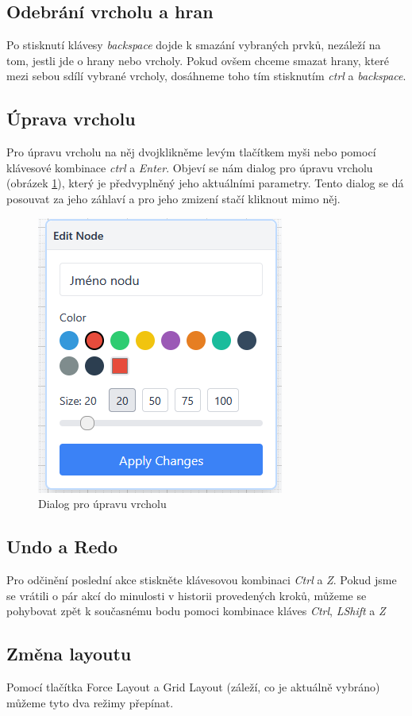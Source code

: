 \subsection{Odebrání vrcholu a hran}
Po stisknutí klávesy \textit{backspace} dojde k smazání vybraných prvků, nezáleží na tom, jestli jde o hrany nebo vrcholy. Pokud ovšem chceme smazat hrany, které mezi sebou sdílí vybrané vrcholy, dosáhneme toho tím stisknutím \textit{ctrl} a \textit{backspace}.
\subsection{Úprava vrcholu}
Pro úpravu vrcholu na něj dvojklikněme levým tlačítkem myši nebo pomocí klávesové kombinace \textit{ctrl} a \textit{Enter}. Objeví se nám dialog pro úpravu vrcholu (obrázek \ref{fig:edit}), který je předvyplněný jeho aktuálními parametry. Tento dialog se dá posouvat za jeho záhlaví a pro jeho zmizení stačí kliknout mimo něj.
\begin{figure}[h]
    \centering
    \includegraphics[width=0.5\linewidth]{Images/style.png}
    \caption{Dialog pro úpravu vrcholu}
    \label{fig:edit}
\end{figure}
\subsection{Undo a Redo}
Pro odčinění poslední akce stiskněte klávesovou kombinaci \textit{Ctrl} a \textit{Z}. Pokud jsme se vrátili o pár akcí do minulosti v historii provedených kroků, můžeme se pohybovat zpět k současnému bodu pomoci kombinace kláves \textit{Ctrl}, \textit{LShift} a \textit{Z}
\subsection{Změna layoutu}
Pomocí tlačítka Force Layout a Grid Layout (záleží, co je aktuálně vybráno) můžeme tyto dva režimy přepínat.
